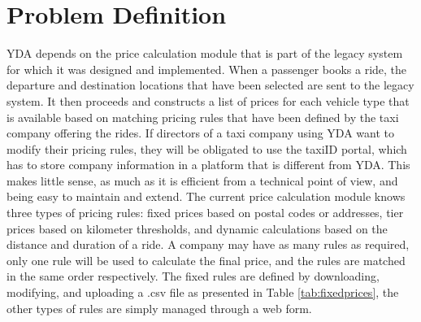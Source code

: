 %
\section{Problem Definition}
YDA depends on the price calculation module that is part of the legacy system for which it was designed and implemented. When a passenger books a ride, the departure and destination locations that have been selected are sent to the legacy system. It then proceeds and constructs a list of prices for each vehicle type that is available based on matching pricing rules that have been defined by the taxi company offering the rides. If directors of a taxi company using YDA want to modify their pricing rules, they will be obligated to use the taxiID portal, which has to store company information in a platform that is different from YDA. This makes little sense, as much as it is efficient from a technical point of view, and being easy to maintain and extend.
%
%
The current price calculation module knows three types of pricing rules: fixed prices based on postal codes or addresses, tier prices based on kilometer thresholds, and dynamic calculations based on the distance and duration of a ride. A company may have as many rules as required, only one rule will be used to calculate the final price, and the rules are matched in the same order respectively. The fixed rules are defined by downloading, modifying, and uploading a .csv file as presented in Table \ref{tab:fixedprices}, the other types of rules are simply managed through a web form.

